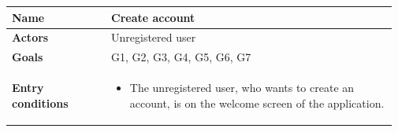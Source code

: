 \begin{table}[H]
	\begin{tabular}{@{}p{0.25\linewidth} p{0.72\linewidth}@{}}
		\toprule
		\textbf{Name}               & Create account \\
		\midrule
		\textbf{Actors}             & Unregistered user \\
		\midrule
		\textbf{Goals}              & G1, G2, G3, G4, G5, G6, G7 \\
		\midrule
		
		\textbf{Entry conditions}   & \begin{itemize}[leftmargin=.4cm,noitemsep,topsep=0pt,before=\vspace{-3mm},after=\vspace{-4mm}]
		    \item The unregistered user, who wants to create an account, is  on the welcome screen of the application.
		\end{itemize}\\
		\midrule
		

\end{tabular}
\end{table}
